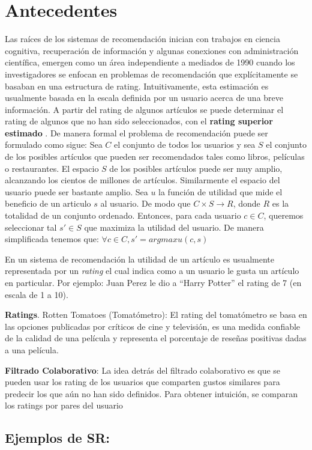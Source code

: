 \section{Antecedentes}

Las raíces de los sistemas de recomendación inician con trabajos en
ciencia cognitiva, recuperación de información y algunas conexiones con
administración científica, emergen como un área independiente a mediados
de 1990 cuando los investigadores se enfocan en problemas de
recomendación que explícitamente se basaban en una estructura de rating.
Intuitivamente, esta estimación es usualmente basada en la escala
definida por un usuario acerca de una breve información. A partir del
rating de algunos artículos se puede determinar el rating de algunos que
no han sido seleccionados, con el \textbf{rating superior estimado} . De
manera formal el problema de recomendación puede ser formulado como
sigue: Sea $C$ el conjunto de todos los usuarios y sea $S$ el
conjunto de los posibles artículos que pueden ser recomendados tales
como libros, películas o restaurantes. El espacio $S$ de los posibles
artículos puede ser muy amplio, alcanzando los cientos de millones de
artículos. Similarmente el espacio del usuario puede ser bastante
amplio. Sea $u$ la función de utilidad que mide el beneficio de un
articulo $s$ al usuario. De modo que $C \times S \rightarrow R$,
donde $R$ es la totalidad de un conjunto ordenado. Entonces, para cada
usuario $c \in C$, queremos seleccionar tal $s' \in S $ que
maximiza la utilidad del usuario. De manera simplificada tenemos que:
$\forall c \in C, s'=arg max u(c,s)$

En un sistema de recomendación la utilidad de un artículo es usualmente
representada por un \emph{rating} el cual indica como a un usuario le gusta un artículo en particular. Por ejemplo: Juan Perez le dio a
``Harry Potter'' el rating de 7 (en escala de 1 a 10).

\textbf{Ratings}. Rotten Tomatoes (Tomatómetro): El rating del
tomatómetro se basa en las opciones publicadas por críticos de cine y
televisión, es una medida confiable de la calidad de una película y
representa el porcentaje de reseñas positivas dadas a una película.

\textbf{Filtrado Colaborativo}: La idea detrás del filtrado colaborativo
es que se pueden usar los rating de los usuarios que comparten gustos
similares para predecir los que aún no han sido definidos. Para obtener
intuición, se comparan los ratings por pares del usuario

\subsection{ Ejemplos de SR:}

